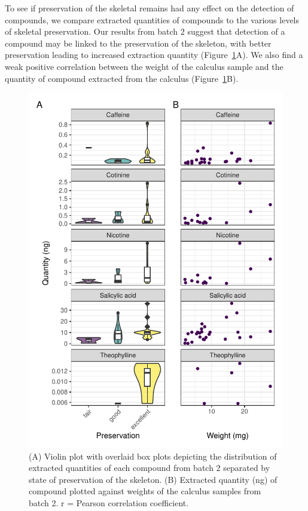 \documentclass[
]{article}
\begin{document}
To see if preservation of the skeletal remains had any effect on the
detection of compounds, we compare extracted quantities of compounds to
the various levels of skeletal preservation. Our results from batch 2
suggest that detection of a compound may be linked to the preservation
of the skeleton, with better preservation leading to increased
extraction quantity (Figure~\ref{fig-detection-preservation}A). We also
find a weak positive correlation between the weight of the calculus
sample and the quantity of compound extracted from the calculus
(Figure~\ref{fig-detection-preservation}B).

\begin{figure}

{\centering \includegraphics{paper_files/figure-pdf/fig-detection-preservation-1.pdf}

}

\caption{\label{fig-detection-preservation}(A) Violin plot with overlaid
box plots depicting the distribution of extracted quantities of each
compound from batch 2 separated by state of preservation of the
skeleton. (B) Extracted quantity (ng) of compound plotted against
weights of the calculus samples from batch 2. r = Pearson correlation
coefficient.}

\end{figure}
\end{document}
